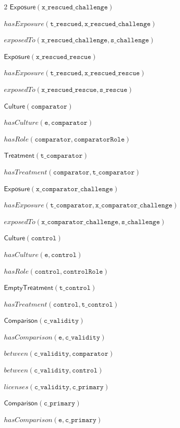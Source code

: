\documentclass[10pt,a4paper]{article}
\begin{document}
{\begin{multicols}{2}
$\mathsf{Exposure}(\mathtt{x\_rescued\_challenge})$\par
$\mathit{hasExposure}(\mathtt{t\_rescued}, \mathtt{x\_rescued\_challenge})$\par
$\mathit{exposedTo}(\mathtt{x\_rescued\_challenge}, \mathtt{s\_challenge})$\par
$\mathsf{Exposure}(\mathtt{x\_rescued\_rescue})$\par
$\mathit{hasExposure}(\mathtt{t\_rescued}, \mathtt{x\_rescued\_rescue})$\par
$\mathit{exposedTo}(\mathtt{x\_rescued\_rescue}, \mathtt{s\_rescue})$\par
$\mathsf{Culture}(\mathtt{comparator})$\par
$\mathit{hasCulture}(\mathtt{e}, \mathtt{comparator})$\par
$\mathit{hasRole}(\mathtt{comparator}, \mathtt{comparatorRole})$\par
$\mathsf{Treatment}(\mathtt{t\_comparator})$\par
$\mathit{hasTreatment}(\mathtt{comparator}, \mathtt{t\_comparator})$\par
$\mathsf{Exposure}(\mathtt{x\_comparator\_challenge})$\par
$\mathit{hasExposure}(\mathtt{t\_comparator}, \mathtt{x\_comparator\_challenge})$\par
$\mathit{exposedTo}(\mathtt{x\_comparator\_challenge}, \mathtt{s\_challenge})$\par
$\mathsf{Culture}(\mathtt{control})$\par
$\mathit{hasCulture}(\mathtt{e}, \mathtt{control})$\par
$\mathit{hasRole}(\mathtt{control}, \mathtt{controlRole})$\par
$\mathsf{EmptyTreatment}(\mathtt{t\_control})$\par
$\mathit{hasTreatment}(\mathtt{control}, \mathtt{t\_control})$\par
$\mathsf{Comparison}(\mathtt{c\_validity})$\par
$\mathit{hasComparison}(\mathtt{e}, \mathtt{c\_validity})$\par
$\mathit{between}(\mathtt{c\_validity}, \mathtt{comparator})$\par
$\mathit{between}(\mathtt{c\_validity}, \mathtt{control})$\par
$\mathit{licenses}(\mathtt{c\_validity}, \mathtt{c\_primary})$\par
$\mathsf{Comparison}(\mathtt{c\_primary})$\par
$\mathit{hasComparison}(\mathtt{e}, \mathtt{c\_primary})$\par

\end{multicols}}
\end{document}
